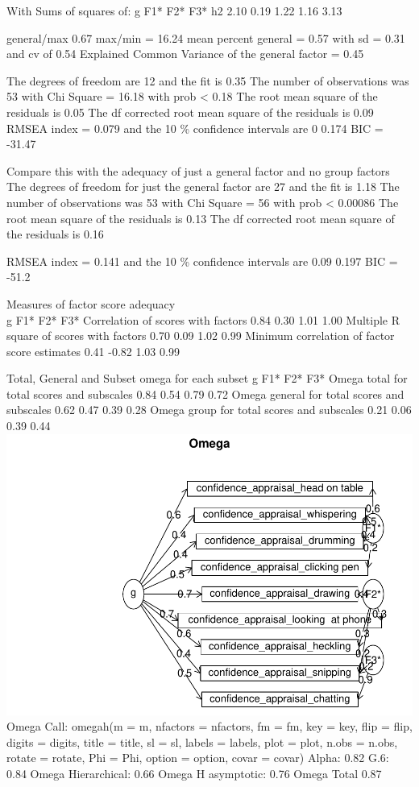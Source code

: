 \documentclass[
]{article}
\begin{document}
With Sums of squares of: g F1* F2* F3* h2 2.10 0.19 1.22 1.16 3.13

general/max 0.67 max/min = 16.24 mean percent general = 0.57 with sd =
0.31 and cv of 0.54 Explained Common Variance of the general factor =
0.45

The degrees of freedom are 12 and the fit is 0.35 The number of
observations was 53 with Chi Square = 16.18 with prob \textless{} 0.18
The root mean square of the residuals is 0.05 The df corrected root mean
square of the residuals is 0.09 RMSEA index = 0.079 and the 10 \%
confidence intervals are 0 0.174 BIC = -31.47

Compare this with the adequacy of just a general factor and no group
factors The degrees of freedom for just the general factor are 27 and
the fit is 1.18 The number of observations was 53 with Chi Square = 56
with prob \textless{} 0.00086 The root mean square of the residuals is
0.13 The df corrected root mean square of the residuals is 0.16

RMSEA index = 0.141 and the 10 \% confidence intervals are 0.09 0.197
BIC = -51.2

Measures of factor score adequacy\\
g F1* F2* F3* Correlation of scores with factors 0.84 0.30 1.01 1.00
Multiple R square of scores with factors 0.70 0.09 1.02 0.99 Minimum
correlation of factor score estimates 0.41 -0.82 1.03 0.99

Total, General and Subset omega for each subset g F1* F2* F3* Omega
total for total scores and subscales 0.84 0.54 0.79 0.72 Omega general
for total scores and subscales 0.62 0.47 0.39 0.28 Omega group for total
scores and subscales 0.21 0.06 0.39 0.44
\includegraphics{expertise_2024_09_26_no_outlierdetection_MK_files/figure-latex/sri_omega-2.pdf}
Omega Call: omegah(m = m, nfactors = nfactors, fm = fm, key = key, flip
= flip, digits = digits, title = title, sl = sl, labels = labels, plot =
plot, n.obs = n.obs, rotate = rotate, Phi = Phi, option = option, covar
= covar) Alpha: 0.82 G.6: 0.84 Omega Hierarchical: 0.66 Omega H
asymptotic: 0.76 Omega Total 0.87
\end{document}

